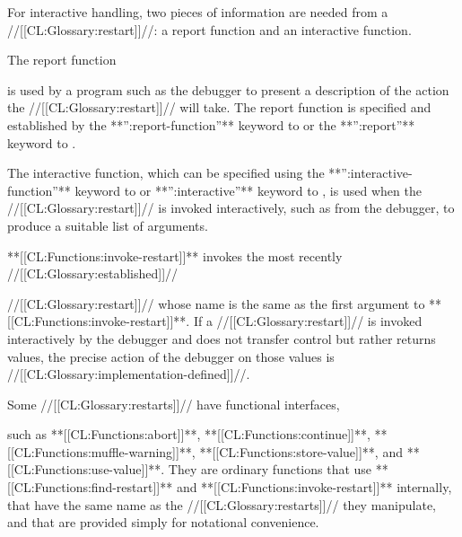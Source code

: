  
For interactive handling, two pieces of information are needed
from a //[[CL:Glossary:restart]]//: a report function and an interactive function.
 
The report function





is used by a program such as the debugger to
present a description of the action the //[[CL:Glossary:restart]]// will take.  
The report function is specified and established by the 
**'':report-function''** keyword to
 or the 
**'':report''** keyword to . 





 
The interactive function, which can be specified using the 
**'':interactive-function''** keyword to 
 or **'':interactive''** keyword
to , is used when the //[[CL:Glossary:restart]]//
is invoked
interactively, such as from the debugger, to produce a suitable
list of arguments. 






 
**[[CL:Functions:invoke-restart]]** invokes the most recently //[[CL:Glossary:established]]//

//[[CL:Glossary:restart]]// whose
name is the same as the first argument to **[[CL:Functions:invoke-restart]]**.
If a //[[CL:Glossary:restart]]// is invoked interactively by the debugger and  does
not transfer control but rather returns values, the precise
action of the debugger on those values is //[[CL:Glossary:implementation-defined]]//.


 
\endsubsubsubsection%
 





Some //[[CL:Glossary:restarts]]// have functional interfaces, 



such as **[[CL:Functions:abort]]**, **[[CL:Functions:continue]]**, 
**[[CL:Functions:muffle-warning]]**, **[[CL:Functions:store-value]]**, and 
**[[CL:Functions:use-value]]**.
They are ordinary functions that use 
 **[[CL:Functions:find-restart]]** and **[[CL:Functions:invoke-restart]]** internally,
that have the same name as the //[[CL:Glossary:restarts]]// they manipulate,
and that are provided simply for notational convenience.
 
